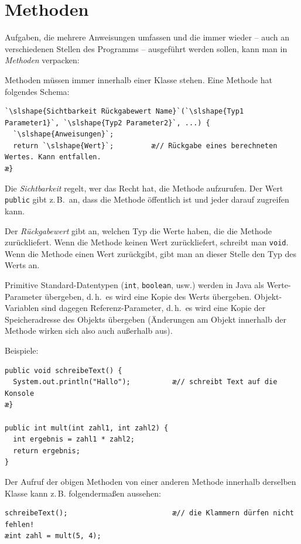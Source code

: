 \section{Methoden}

Aufgaben, die mehrere Anweisungen umfassen und die immer wieder -- auch an
verschiedenen Stellen des Programms -- ausgeführt werden sollen, kann man in
\emph{Methoden} \glqq verpacken\grqq :

Methoden müssen immer innerhalb einer Klasse stehen. Eine Methode hat
folgendes Schema:

\begin{lstlisting}
`\slshape{Sichtbarkeit Rückgabewert Name}`(`\slshape{Typ1 Parameter1}`, `\slshape{Typ2 Parameter2}`, ...) {
  `\slshape{Anweisungen}`;
  return `\slshape{Wert}`;         æ// Rückgabe eines berechneten Wertes. Kann entfallen.
æ}
\end{lstlisting}

Die \emph{Sichtbarkeit} regelt, wer das Recht hat, die Methode aufzurufen. Der
Wert \lstinline|public| gibt z.\,B.\ an, dass die Methode öffentlich ist und jeder
darauf zugreifen kann.

Der \emph{Rückgabewert} gibt an, welchen Typ die Werte haben, die die Methode
zurückliefert. Wenn die Methode keinen Wert zurückliefert, schreibt man
\lstinline|void|. Wenn die Methode einen Wert zurückgibt, gibt man an dieser
Stelle den Typ des Werts an.

Primitive Standard-Datentypen (\lstinline|int|, \lstinline|boolean|, usw.) werden
in Java als Werte-Parameter übergeben, d.\,h.\ es wird eine Kopie des Werts
übergeben. Objekt-Variablen sind dagegen Referenz-Parameter, d.\,h.\ es wird
eine Kopie der Speicheradresse des Objekts übergeben (Änderungen am Objekt
innerhalb der Methode wirken sich also auch außerhalb aus).

Beispiele:

\begin{lstlisting}
public void schreibeText() {
  System.out.println("Hallo");          æ// schreibt Text auf die Konsole
æ}

public int mult(int zahl1, int zahl2) {
  int ergebnis = zahl1 * zahl2;
  return ergebnis;
}
\end{lstlisting}

Der Aufruf der obigen Methoden von einer anderen Methode innerhalb derselben Klasse kann z.\,B.
folgendermaßen aussehen:

\begin{lstlisting}
schreibeText();                         æ// die Klammern dürfen nicht fehlen!
æint zahl = mult(5, 4);
\end{lstlisting}